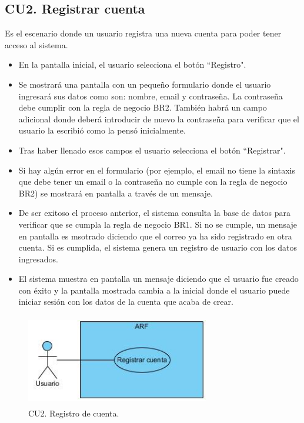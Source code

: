 \subsection{CU2. Registrar cuenta} \par
Es el escenario donde un usuario registra una nueva cuenta para poder tener acceso al sistema.
\begin{itemize}
	\item En la pantalla inicial, el usuario selecciona el botón ``Registro".
	\item Se mostrará una pantalla con un pequeño formulario donde el usuario ingresará sus datos como son: nombre, email y contraseña. La contraseña debe cumplir con la regla de negocio BR2. También habrá un campo adicional donde deberá introducir de nuevo la contraseña para verificar que el usuario la escribió como la pensó inicialmente.
	\item Tras haber llenado esos campos el usuario selecciona el botón ``Registrar".
	\item Si hay algún error en el formulario (por ejemplo, el email no tiene la sintaxis que debe tener un email o la contraseña no cumple con la regla de negocio BR2) se mostrará en pantalla a través de un mensaje.
	\item De ser exitoso el proceso anterior, el sistema consulta la base de datos para verificar que se cumpla la regla de negocio BR1. Si no se cumple, un mensaje en pantalla es msotrado diciendo que el correo ya ha sido registrado en otra cuenta. Si es cumplida, el sistema genera un registro de usuario con los datos ingresados.
	\item El sistema muestra en pantalla un mensaje diciendo que el usuario fue creado con éxito y la pantalla mostrada cambia a la inicial donde el usuario puede iniciar sesión con los datos de la cuenta que acaba de crear.
\end{itemize}

\begin{figure}[!htbp]
	\centering
	\includegraphics[width=8cm,height=4cm]{imagenes/analisis/cu/registrar_cuenta.jpg}
	\caption{CU2. Registro de cuenta.}
	\label{fig:registrarcuenta}
\end{figure} 


